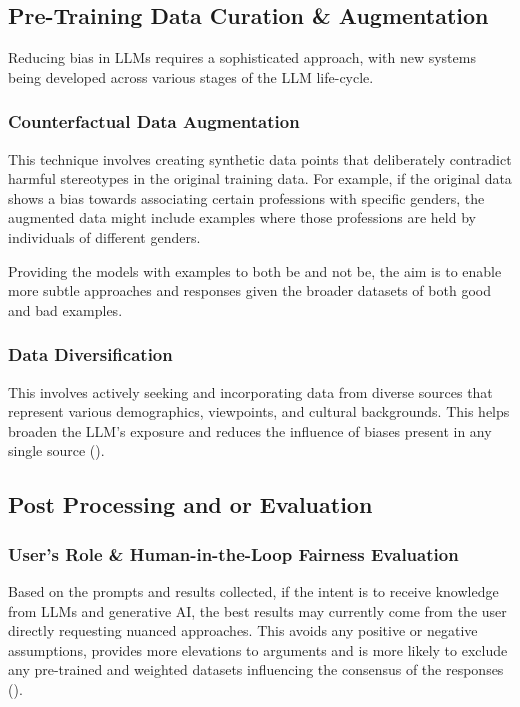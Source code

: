 \documentclass[12pt]{article}
\begin{document}
\subsection{Pre-Training Data Curation \& Augmentation}

Reducing bias in LLMs requires a sophisticated approach, with new systems being developed across various stages of the LLM life-cycle.

\subsubsection{Counterfactual Data Augmentation}

This technique involves creating synthetic data points that deliberately contradict harmful stereotypes in the original training data. For example, if the original data shows a bias towards associating certain professions with specific genders, the augmented data might include examples where those professions are held by individuals of different genders.

Providing the models with examples to both be and not be, the aim is to enable more subtle approaches and responses given the broader datasets of both good and bad examples.

\subsubsection{Data Diversification}

This involves actively seeking and incorporating data from diverse sources that represent various demographics, viewpoints, and cultural backgrounds. This helps broaden the LLM's exposure and reduces the influence of biases present in any single source (\cite{openagi-feedbackloops}).

\subsection{Post Processing and or Evaluation}

\subsubsection{User's Role \& Human-in-the-Loop Fairness Evaluation}

Based on the prompts and results collected, if the intent is to receive knowledge from LLMs and generative AI, the best results may currently come from the user directly requesting nuanced approaches. This avoids any positive or negative assumptions, provides more elevations to arguments and is more likely to exclude any pre-trained and weighted datasets influencing the consensus of the responses (\cite{tsiakas-2022}). 
\end{document}
